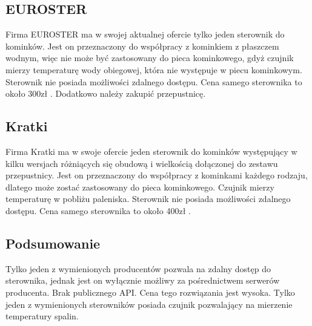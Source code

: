 \documentclass[11pt]{report}
\begin{document}
 \subsection{EUROSTER}
 Firma EUROSTER ma w swojej aktualnej ofercie \cite{Euroster} tylko jeden sterownik do kominków. Jest on \cite{EurosterSterownik} przeznaczony do współpracy z kominkiem z płaszczem wodnym, więc nie może być zastosowany do pieca kominkowego, gdyż czujnik mierzy temperaturę wody obiegowej, która nie występuje w piecu kominkowym. Sterownik nie posiada możliwości zdalnego dostępu.
 Cena samego sterownika to około 300zł \cite{EurosterSterownikCena}. Dodatkowo należy zakupić przepustnicę.
 \subsection{Kratki}
 Firma Kratki ma w swoje ofercie \cite{Kratki} jeden sterownik do kominków występujący w kilku wersjach różniących się obudową i wielkością dołączonej do zestawu przepustnicy.
 Jest on przeznaczony do współpracy z kominkami każdego rodzaju, dlatego może zostać zastosowany do pieca kominkowego. Czujnik mierzy temperaturę w pobliżu paleniska. Sterownik nie posiada możliwości zdalnego dostępu. 
 Cena samego sterownika to około 400zł \cite{KratkiSterownik}.
  \subsection{Podsumowanie}
  Tylko jeden z wymienionych producentów pozwala na zdalny dostęp do sterownika, jednak jest on wyłącznie możliwy za pośrednictwem serwerów producenta. Brak publicznego API. Cena tego rozwiązania jest wysoka.
  Tylko jeden z wymienionych sterowników posiada czujnik pozwalający na mierzenie temperatury spalin.
  
  
\end{document}
